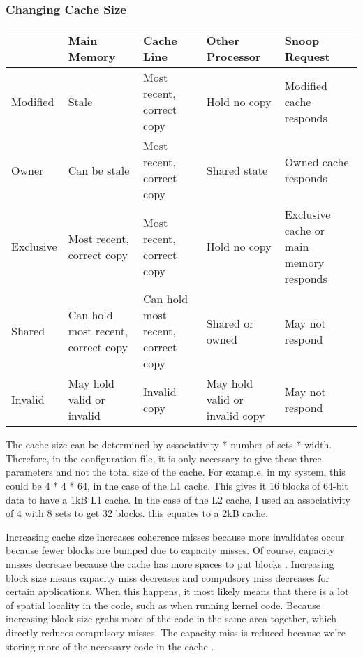 \documentclass[letterpaper]{article}
\begin{document}
\subsubsection[Changing Cache Size]{\rmfamily Changing Cache Size}
\begin{center}
\tablehead{}
\begin{supertabular}{|m{1.2212598in}|m{1.2212598in}|m{1.2212598in}|m{1.2212598in}|m{1.2212598in}|}
\hline
~
 &
Main Memory &
Cache Line &
Other Processor &
Snoop Request\\\hline
Modified &
Stale &
Most recent, correct copy &
Hold no copy &
Modified cache responds\\\hline
Owner &
Can be stale &
Most recent, correct copy &
Shared state &
Owned cache responds\\\hline
Exclusive &
Most recent, correct copy &
Most recent, correct copy &
Hold no copy &
Exclusive cache or main memory responds\\\hline
Shared &
Can hold most recent, correct copy &
Can hold most recent, correct copy &
Shared or owned &
May not respond\\\hline
Invalid &
May hold valid or invalid &
Invalid copy &
May hold valid or invalid copy &
May not respond\\\hline
\end{supertabular}
\end{center}
The cache size can be determined by associativity * number of sets * width. Therefore, in the configuration file, it is only necessary to give these three parameters and not the total size of the cache. For example, in my system, this could be 4 * 4 * 64, in the case of the L1 cache. This gives it 16 blocks of 64-bit data to have a 1kB L1 cache. In the case of the L2 cache, I used an associativity of 4 with 8 sets to get 32 blocks. this equates to a 2kB cache.

Increasing cache size increases coherence misses because more invalidates occur because fewer blocks are bumped due to capacity misses. Of course, capacity misses decrease because the cache has more spaces to put blocks \cite{HEN00}. Increasing block size means capacity miss decreases and compulsory miss decreases for certain applications. When this happens, it most likely means that there is a lot of spatial locality in the code, such as when running kernel code. Because increasing block size grabs more of the code in the same area together, which directly reduces compulsory misses. The capacity miss is reduced because we're storing more of the necessary code in the cache \cite{HEN00}.
\end{document}
